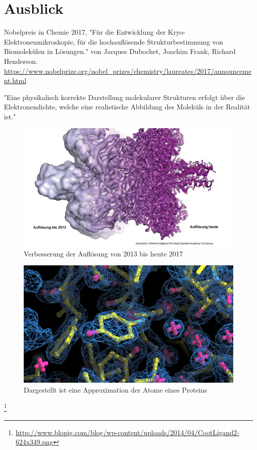 \chapter{Ausblick}

Nobelpreis in Chemie 2017, "Für die Entwicklung der Kryo-Elektronenmikroskopie, für die hochauflösende Strukturbestimmung von Biomolekülen in Lösungen." von Jacques Dubochet, Joachim Frank, Richard Henderson. 
\url{https://www.nobelprize.org/nobel_prizes/chemistry/laureates/2017/announcement.html}


"Eine physikalisch korrekte Darstellung molekularer Strukturen erfolgt über die Elektronendichte, welche eine realistische Abbildung des Moleküls in der Realität ist."

\begin{figure}
\centering
\includegraphics[width=.95\textwidth]{images/Verbesserung_der_Aufloesung.jpg}
\caption{Verbesserung der Auflösung von 2013 bis heute 2017}
\label{fig:auflösung}
\end{figure}



\begin{figure}
\centering
\includegraphics[width=.95\textwidth]{images/approximation.png}
\caption{Dargestellt ist eine Approximation der Atome eines Proteins}
\label{fig:approximation}
\end{figure}

\footnote{\url{http://www.blopig.com/blog/wp-content/uploads/2014/04/CootLigand2-624x349.png}}